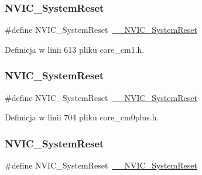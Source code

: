 \subsubsection{\texorpdfstring{N\+V\+I\+C\+\_\+\+System\+Reset}{NVIC\_SystemReset}\hspace{0.1cm}{\footnotesize\ttfamily [2/12]}}
{\footnotesize\ttfamily \#define N\+V\+I\+C\+\_\+\+System\+Reset~\hyperlink{group___c_m_s_i_s___core___n_v_i_c_functions_ga0d9aa2d30fa54b41eb780c16e35b676c}{\+\_\+\+\_\+\+N\+V\+I\+C\+\_\+\+System\+Reset}}



Definicja w linii 613 pliku core\+\_\+cm1.\+h.

\mbox{\label{group___c_m_s_i_s___core___n_v_i_c_functions_ga6aa0367d3642575610476bf0366f0c48}} 
\subsubsection{\texorpdfstring{N\+V\+I\+C\+\_\+\+System\+Reset}{NVIC\_SystemReset}\hspace{0.1cm}{\footnotesize\ttfamily [3/12]}}
{\footnotesize\ttfamily \#define N\+V\+I\+C\+\_\+\+System\+Reset~\hyperlink{group___c_m_s_i_s___core___n_v_i_c_functions_ga0d9aa2d30fa54b41eb780c16e35b676c}{\+\_\+\+\_\+\+N\+V\+I\+C\+\_\+\+System\+Reset}}



Definicja w linii 704 pliku core\+\_\+cm0plus.\+h.

\mbox{\label{group___c_m_s_i_s___core___n_v_i_c_functions_ga6aa0367d3642575610476bf0366f0c48}} 
\subsubsection{\texorpdfstring{N\+V\+I\+C\+\_\+\+System\+Reset}{NVIC\_SystemReset}\hspace{0.1cm}{\footnotesize\ttfamily [4/12]}}
{\footnotesize\ttfamily \#define N\+V\+I\+C\+\_\+\+System\+Reset~\hyperlink{group___c_m_s_i_s___core___n_v_i_c_functions_ga0d9aa2d30fa54b41eb780c16e35b676c}{\+\_\+\+\_\+\+N\+V\+I\+C\+\_\+\+System\+Reset}}



